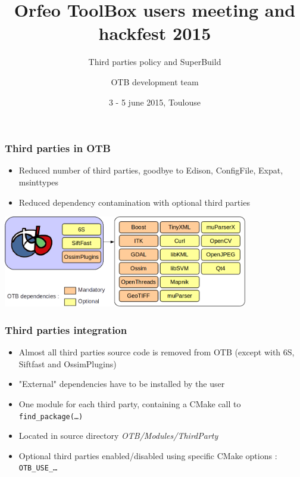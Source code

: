 \documentclass[8pt]{beamer}
\title{Orfeo ToolBox users meeting and hackfest 2015}
\subtitle{Third parties policy and SuperBuild}
\author{OTB development team}%
\date{3 - 5 june 2015, Toulouse}
\begin{document}
\begin{frame}
\titlepage
\end{frame}

\begin{frame}
\frametitle{Third parties in OTB}

\begin{itemize}
\item Reduced number of third parties, goodbye to Edison, ConfigFile, Expat, msinttypes
\item Reduced dependency contamination with optional third parties
\end{itemize}

\begin{center}
\includegraphics[height=4cm]{images/otb_3rd_parties}
\end{center}

\end{frame}

\begin{frame}
\frametitle{Third parties integration}

\begin{itemize}
\item Almost all third parties source code is removed from OTB (except with 6S, Siftfast and OssimPlugins)
\item "External" dependencies have to be installed by the user
\item One module for each third party, containing a CMake call to \texttt{find\_package(\ldots)}
\item Located in source directory \emph{OTB/Modules/ThirdParty}
\item Optional third parties enabled/disabled using specific CMake options : \texttt{OTB\_USE\_\ldots}
\end{itemize}



\end{frame}
\end{document}
